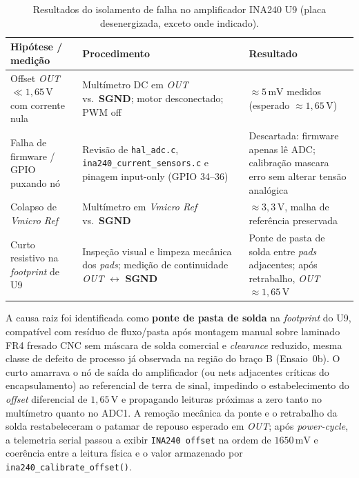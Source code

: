 \begin{table}[H]
    \centering
    \caption{Resultados do isolamento de falha no amplificador INA240 U9 (placa desenergizada, exceto onde indicado).}
    \label{tab:depuracao_curto_ina240_u9}
    \begin{tabular}{p{4.2cm}p{5.8cm}p{4.5cm}}
        \toprule
        \textbf{Hipótese / medição} & \textbf{Procedimento} & \textbf{Resultado} \\
        \midrule
        Offset \textit{OUT} $\ll 1{,}65\,\text{V}$ com corrente nula &
        Multímetro DC em \textit{OUT} vs.\ \textbf{SGND}; motor desconectado; PWM off &
        $\approx 5\,\text{mV}$ medidos (esperado $\approx 1{,}65\,\text{V}$) \\
        Falha de firmware / GPIO puxando nó &
        Revisão de \texttt{hal\_adc.c}, \texttt{ina240\_current\_sensors.c} e pinagem input-only (GPIO 34--36) &
        Descartada: firmware apenas lê ADC; calibração mascara erro sem alterar tensão analógica \\
        Colapso de \textit{Vmicro Ref} &
        Multímetro em \textit{Vmicro Ref} vs.\ \textbf{SGND} &
        $\approx 3{,}3\,\text{V}$, malha de referência preservada \\
        Curto resistivo na \textit{footprint} de U9 &
        Inspeção visual e limpeza mecânica dos \textit{pads}; medição de continuidade \textit{OUT} $\leftrightarrow$ \textbf{SGND} &
        Ponte de pasta de solda entre \textit{pads} adjacentes; após retrabalho, \textit{OUT} $\approx 1{,}65\,\text{V}$ \\
        \bottomrule
    \end{tabular}
\end{table}


A causa raiz foi identificada como \textbf{ponte de pasta de solda} na \textit{footprint} do U9, compatível com resíduo de fluxo/pasta após montagem manual sobre laminado FR4 fresado CNC sem máscara de solda comercial e \textit{clearance} reduzido, mesma classe de defeito de processo já observada na região do braço B (Ensaio~0b). O curto amarrava o nó de saída do amplificador (ou nets adjacentes críticas do encapsulamento) ao referencial de terra de sinal, impedindo o estabelecimento do \textit{offset} diferencial de $1{,}65\,\text{V}$ e propagando leituras próximas a zero tanto no multímetro quanto no ADC1. A remoção mecânica da ponte e o retrabalho da solda restabeleceram o patamar de repouso esperado em \textit{OUT}; após \textit{power-cycle}, a telemetria serial passou a exibir \texttt{INA240 offset} na ordem de $1650\,\text{mV}$ e coerência entre a leitura física e o valor armazenado por \texttt{ina240\_calibrate\_offset()}.

